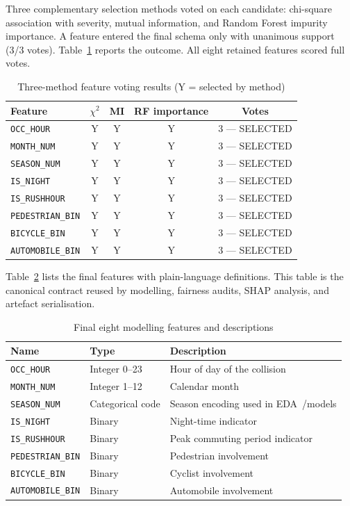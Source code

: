 \documentclass[11pt,a4paper]{article}
\begin{document}
Three complementary selection methods voted on each candidate: chi-square association with severity, mutual information, and Random Forest impurity importance. A feature entered the final schema only with unanimous support (3/3 votes). Table~\ref{tab:votes} reports the outcome. All eight retained features scored full votes.

\begin{table}[htbp]
\centering
\caption{Three-method feature voting results (Y = selected by method)}
\label{tab:votes}
\small
\begin{tabular}{@{}lcccc@{}}
\toprule
\textbf{Feature} & $\chi^{2}$ & MI & RF importance & Votes \\
\midrule
\texttt{OCC\_HOUR} & Y & Y & Y & 3 --- SELECTED \\
\texttt{MONTH\_NUM} & Y & Y & Y & 3 --- SELECTED \\
\texttt{SEASON\_NUM} & Y & Y & Y & 3 --- SELECTED \\
\texttt{IS\_NIGHT} & Y & Y & Y & 3 --- SELECTED \\
\texttt{IS\_RUSHHOUR} & Y & Y & Y & 3 --- SELECTED \\
\texttt{PEDESTRIAN\_BIN} & Y & Y & Y & 3 --- SELECTED \\
\texttt{BICYCLE\_BIN} & Y & Y & Y & 3 --- SELECTED \\
\texttt{AUTOMOBILE\_BIN} & Y & Y & Y & 3 --- SELECTED \\
\bottomrule
\end{tabular}
\end{table}

Table~\ref{tab:featdesc} lists the final features with plain-language definitions. This table is the canonical contract reused by modelling, fairness audits, SHAP analysis, and artefact serialisation.

\begin{table}[htbp]
\centering
\caption{Final eight modelling features and descriptions}
\label{tab:featdesc}
\small
\begin{tabular}{@{}llp{7.4cm}@{}}
\toprule
\textbf{Name} & \textbf{Type} & \textbf{Description} \\
\midrule
\texttt{OCC\_HOUR} & Integer 0--23 & Hour of day of the collision \\
\texttt{MONTH\_NUM} & Integer 1--12 & Calendar month \\
\texttt{SEASON\_NUM} & Categorical code & Season encoding used in EDA~/models \\
\texttt{IS\_NIGHT} & Binary & Night-time indicator \\
\texttt{IS\_RUSHHOUR} & Binary & Peak commuting period indicator \\
\texttt{PEDESTRIAN\_BIN} & Binary & Pedestrian involvement \\
\texttt{BICYCLE\_BIN} & Binary & Cyclist involvement \\
\texttt{AUTOMOBILE\_BIN} & Binary & Automobile involvement \\
\bottomrule
\end{tabular}
\end{table}
\end{document}
